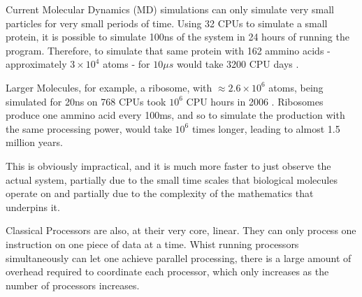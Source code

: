 Current Molecular Dynamics (MD) simulations can only simulate very small particles for very small periods of time. Using 32 CPUs to simulate a small protein, it is possible to simulate 100ns of the system in 24 hours of running the program. Therefore, to simulate that same protein with 162 ammino acids - approximately $3\times 10^{4}$ atoms - for $10\mu s$ would take 3200 CPU days \cite{MDsim}. 

Larger Molecules, for example, a ribosome, with $\approx 2.6\times 10^{6}$ atoms, being simulated for 20ns on 768 CPUs took $10^{6}$ CPU hours in 2006 \cite{Sanbonmatsu_2006}. Ribosomes produce one ammino acid every 100ms, and so to simulate the production with the same processing power, would take $10^{6}$ times longer, leading to almost 1.5 million years.

This is obviously impractical, and it is much more faster to just observe the actual system, partially due to the small time scales that biological molecules operate on and partially due to the complexity of the mathematics that underpins it.

Classical Processors are also, at their very core, linear. They can only process one instruction on one piece of data at a time. Whist running processors simultaneously can let one achieve parallel processing, there is a large amount of overhead required to coordinate each processor, which only increases as the number of processors increases.
